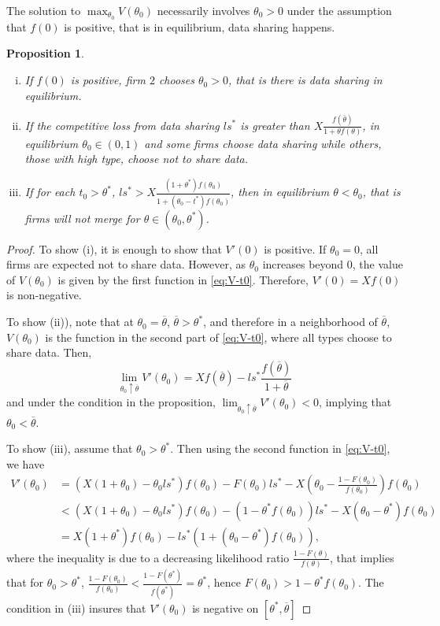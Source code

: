 \documentclass[a4paper]{article}
\newtheorem{prop}{Proposition}
\renewcommand{\t}{\theta}
\begin{document}
%
The solution to $\max_{\t_0} V(\t_0)$ necessarily involves $\t_0>0$ under the assumption that $f(0)$ is positive, that is in equilibrium, data sharing happens.
\begin{prop}
  \begin{enumerate}[(i)]\setlength\itemsep{0em}
    \item If $f(0)$ is positive, firm $2$ chooses $\t_0>0$, that is there is data sharing in equilibrium. 
    \item If the competitive loss from data sharing $l s^*$ is greater than $X\frac{f(\overline \t)}{1+\t f(\t)}$, in equilibrium $\t_0\in (0,1)$ and some firms choose data sharing while others, those with high type, choose not to share data.
    \item If for each $t_0>\t^*$, $ls^*>X\frac{(1+\t^*)f(\t_0)}{1+(\t_0-t^*)f(\t_0)}$, then in equilibrium $\t<\t_0$, that is firms will not merge for $\t\in (\t_0,\t^*)$.
  \end{enumerate}
\end{prop}
\begin{proof}
  To show (i), it is enough to show that $V'(0)$ is positive. If $\t_0=0$, all firms are expected not to share data. However, as $\theta_0$ increases beyond $0$, the value of $V(\t_0)$ is given by the first function in \eqref{eq:V-t0}. Therefore, $V'(0)=Xf(0)$ is non-negative.

  To show (ii)), note that at $\t_0=\overline \t$, $\overline \t>\t^*$, and therefore in a neighborhood of $\overline \t$, $V(\t_0)$ is the function in the second part of \eqref{eq:V-t0}, where all types choose to share data. Then, 
  \[
    \lim_{\t_0\uparrow \overline \t}V'(\t_0)=Xf(\overline \t)-ls^* \frac{f(\overline \t)}{1+\overline \t}
 \]
and under the condition in the proposition, $\lim_{\t_0\uparrow \overline \t}V'(\t_0)<0$, implying that $\t_0<\overline \t$.

To show (iii), assume that $\t_0>\t^*$. Then using the second function in \eqref{eq:V-t0}, we have
\begin{align*}
  V'(\t_0)&=(X(1+\t_0)-\t_0ls^*)f(\t_0)-F(\t_0)l s^*- X\left(\t_0-\frac{1-F(\t_0)}{f(\t_0)}\right)f(\t_0)\\ 
  &<(X(1+\t_0)-\t_0ls^*)f(\t_0)- (1-\t^* f(\t_0)) l s^*- X\left(\t_0-\t^*\right)f(\t_0)\\ 
  &=X(1+\t^*)f(\t_0)-ls^*(1+(\t_0-\t^*)f(\t_0)),
\end{align*}
  where the inequality is due to a decreasing likelihood ratio $\frac{1-F(\t)}{f(\t)}$, that implies that for $\t_0>\t^*$,  $\frac{1-F(\t_0)}{f(\t_0)}<\frac{1-F(\t^*)}{f(\t^*)}=\t^*$, hence $F(\t_0)>1-\t^*f(\t_0)$. The condition in (iii) insures that $V'(\t_0)$ is negative on $[\t^*,\overline \t]$
\end{proof}
\end{document}
